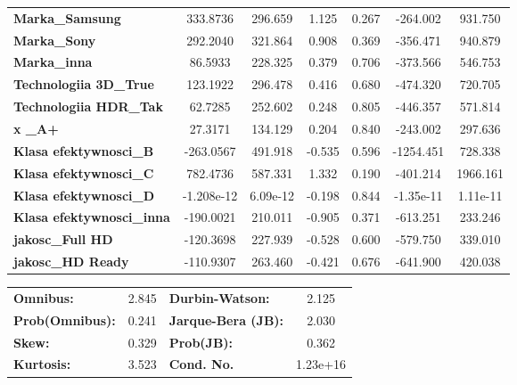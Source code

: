 \documentclass[11pt,a4paper]{article}
\begin{document}
\begin{center}
\begin{tabular}{lcccccc}
				\textbf{Marka\_Samsung}           &     333.8736  &      296.659     &     1.125  &         0.267        &     -264.002    &      931.750     \\
				\textbf{Marka\_Sony}              &     292.2040  &      321.864     &     0.908  &         0.369        &     -356.471    &      940.879     \\
				\textbf{Marka\_inna}              &      86.5933  &      228.325     &     0.379  &         0.706        &     -373.566    &      546.753     \\
				\textbf{Technologiia 3D\_True}     &     123.1922  &      296.478     &     0.416  &         0.680        &     -474.320    &      720.705     \\
				\textbf{Technologiia HDR\_Tak}     &      62.7285  &      252.602     &     0.248  &         0.805        &     -446.357    &      571.814     \\
				\textbf{x \_A+}   &      27.3171  &      134.129     &     0.204  &         0.840        &     -243.002    &      297.636     \\
				\textbf{Klasa efektywnosci\_B}    &    -263.0567  &      491.918     &    -0.535  &         0.596        &    -1254.451    &      728.338     \\
				\textbf{Klasa efektywnosci\_C}    &     782.4736  &      587.331     &     1.332  &         0.190        &     -401.214    &     1966.161     \\
				\textbf{Klasa efektywnosci\_D}    &   -1.208e-12  &     6.09e-12     &    -0.198  &         0.844        &    -1.35e-11    &     1.11e-11     \\
				\textbf{Klasa efektywnosci\_inna} &    -190.0021  &      210.011     &    -0.905  &         0.371        &     -613.251    &      233.246     \\
				\textbf{jakosc\_Full HD}          &    -120.3698  &      227.939     &    -0.528  &         0.600        &     -579.750    &      339.010     \\
				\textbf{jakosc\_HD Ready}         &    -110.9307  &      263.460     &    -0.421  &         0.676        &     -641.900    &      420.038     \\
				 
			\end{tabular}
			\begin{tabular}{lclc}
				\textbf{Omnibus:}       &  2.845 & \textbf{  Durbin-Watson:     } &    2.125  \\
				\textbf{Prob(Omnibus):} &  0.241 & \textbf{  Jarque-Bera (JB):  } &    2.030  \\
				\textbf{Skew:}          &  0.329 & \textbf{  Prob(JB):          } &    0.362  \\
				\textbf{Kurtosis:}      &  3.523 & \textbf{  Cond. No.          } & 1.23e+16  \\
				 
			\end{tabular}
		\end{center}
		
\end{document}
